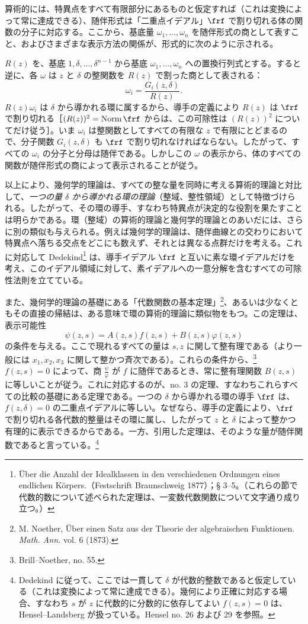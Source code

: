 \documentclass[11pt]{article}
\begin{document}
算術的には、特異点をすべて有限部分にあるものと仮定すれば（これは変換によって常に達成できる）、随伴形式は「二重点イデアル」\(\frf\) で割り切れる体の関数の分子に対応する。ここから、基底量 \(\omega_1,\ldots,\omega_n\) を随伴形式の商として表すこと、およびさまざまな表示方法の関係が、形式的に次のように示される。

\(R(z)\) を、基底 \(1,\delta,\ldots,\delta^{n-1}\) から基底 \(\omega_1,\ldots,\omega_n\) への置換行列式とする。すると逆に、各 \(\omega\) は \(z\) と \(\delta\) の整関数を \(R(z)\) で割った商として表される：
\[
\omega_i=\frac{G_i(z,\delta)}{R(z)}.
\]
\(R(z)\omega_i\) は \(\delta\) から導かれる環に属するから、導手の定義により \(R(z)\) は \(\frf\) で割り切れる［\((R(z))^2=\operatorname{Norm}\frf\) からは、この可除性は \((R(z))^2\) についてだけ従う］。いま \(\omega_i\) は整関数としてすべての有限な \(z\) で有限にとどまるので、分子関数 \(G_i(z,\delta)\) も \(\frf\) で割り切れなければならない。したがって、すべての \(\omega_i\) の分子と分母は随伴である。しかしこの \(\omega\) の表示から、体のすべての関数が随伴形式の商によって表示されることが従う。

以上により、幾何学的理論は、すべての整な量を同時に考える算術的理論と対比して、\emph{一つの量 \(\delta\) から導かれる環の理論}（整域、整性領域）として特徴づけられる。したがって、その環の導手、すなわち特異点が決定的な役割を果たすことは明らかである。環（整域）の算術的理論と幾何学的理論とのあいだには、さらに別の類似も与えられる。例えば幾何学的理論は、随伴曲線との交わりにおいて特異点へ落ちる交点をどこにも数えず、それとは異なる点群だけを考える。これに対応して Dedekind\footnote{Über die Anzahl der Idealklassen in den verschiedenen Ordnungen eines endlichen Körpers.（Festschrift Braunschweig 1877）；§ 3--5。（これらの節で代数的数について述べられた定理は、一変数代数関数について文字通り成り立つ。）} は、導手イデアル \(\frf\) と互いに素な環イデアルだけを考え、このイデアル領域に対して、素イデアルへの一意分解を含むすべての可除性法則を立てている。

また、幾何学的理論の基礎にある「代数関数の基本定理」\footnote{M. Noether, Über einen Satz aus der Theorie der algebraischen Funktionen. \emph{Math. Ann.} vol. 6 (1873).}、あるいは少なくともその直接の帰結は、ある意味で環の算術的理論に類似物をもつ。この定理は、表示可能性
\[
\psi(z,s)=A(z,s)f(z,s)+B(z,s)\varphi(z,s)
\]
の条件を与える。ここで現れるすべての量は \(s,z\) に関して整有理である（より一般には \(x_1,x_2,x_3\) に関して整かつ斉次である）。これらの条件から、\footnote{Brill--Noether, no. 55.} \(f(z,s)=0\) によって、商 \(\frac{\psi}{\varphi}\) が \(f\) に随伴であるとき、常に整有理関数 \(B(z,s)\) に等しいことが従う。これに対応するのが、no. 3 の定理、すなわちこれらすべての比較の基礎にある定理である。一つの \(\delta\) から導かれる環の導手 \(\frf\) は、\(f(z,\delta)=0\) の二重点イデアルに等しい。なぜなら、導手の定義により、\(\frf\) で割り切れる各代数的整量はその環に属し、したがって \(z\) と \(\delta\) によって整かつ有理的に表示できるからである。一方、引用した定理は、そのような量が随伴関数であると言っている。\footnote{Dedekind に従って、ここでは一貫して \(\delta\) が代数的整数であると仮定している（これは変換によって常に達成できる）。幾何により正確に対応する場合、すなわち \(s\) が \(z\) に代数的に分数的に依存してよい \(f(z,s)=0\) は、Hensel--Landsberg が扱っている。Hensel no. 26 および 29 を参照。}
\end{document}
